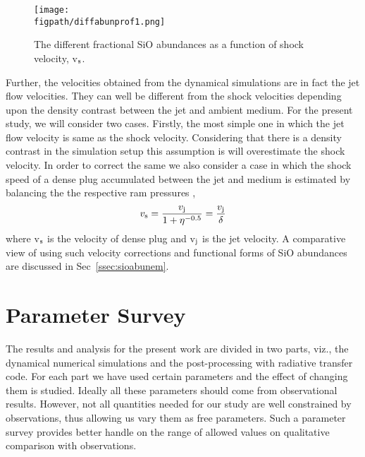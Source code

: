 \documentclass[useAMS,usenatbib]{mn2e}
\newcommand{\figpath}{PFIGS/}
\begin{document}
\begin{figure}
 \texttt{[image: \\figpath/diffabunprof1.png]}
 \caption{The different fractional SiO abundances as a function of
   shock velocity, v$_{\rm s}$.}
 \label{abun}
\end{figure}

Further, the velocities obtained from the dynamical simulations are in fact the
jet flow velocities. They can well be different from the shock
velocities depending upon the density contrast between the jet and
ambient medium. For the present study, we will consider two
cases. Firstly, the most simple one in which the jet flow velocity is
same as the shock velocity. Considering that there is a density
contrast in the simulation setup this assumption is will
overestimate the shock velocity. In order to correct the same we also
consider a case in which the shock speed of a dense plug accumulated
between the jet and medium is estimated by balancing the the respective ram
pressures \citep{Masson:1993p9661},
\begin{equation}
\label{eq:shockjetvel}
v_{\rm s} = \frac{v_{\rm j}}{1 + \eta^{-0.5}} = \frac{v_{\rm j}}{\delta}
\end{equation}
where v$_{\rm s}$ is the velocity of dense plug and v$_{\rm j}$ is the
jet velocity. A comparative view of using such velocity corrections and
functional forms of SiO abundances are discussed in
Sec~\ref{ssec:sioabunem}.

    







\section{Parameter Survey}
\label{sec:parasurvey}
The results and analysis for the present work are divided in two parts,
viz., the dynamical numerical simulations and the post-processing with
radiative transfer code. For each part we have used certain parameters
and the effect of changing them is studied. Ideally all these parameters should come from observational
results. However, not all quantities needed for our study are well
constrained by observations, thus allowing us vary them as
free parameters. Such a parameter survey provides better handle on the range of allowed
values on qualitative comparison with observations. 
%
\end{document}
